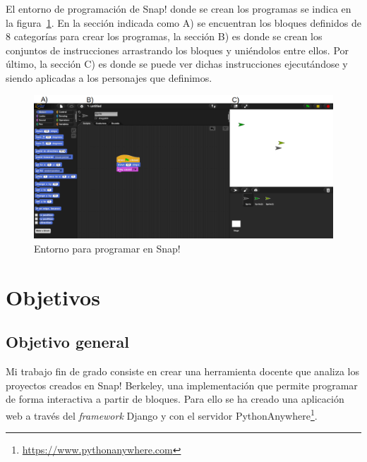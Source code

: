 \documentclass[a4paper, 12pt]{book}
\begin{document}
El entorno de programación de Snap! donde se crean los programas se indica en la figura~\ref{figura:entorno_snapp}. En la sección indicada como A) se encuentran los bloques definidos de 8 categorías para crear los programas, la sección B) es donde se crean los conjuntos de instrucciones arrastrando los bloques y uniéndolos entre ellos. Por último, la sección C) es donde se puede ver dichas instrucciones ejecutándose y siendo aplicadas a los personajes que definimos.
\begin{figure}[h]
        \centering
        \includegraphics[scale=0.35]{img/entorno.png}
        \caption{Entorno para programar en Snap!}
        \label{figura:entorno_snapp}
\end{figure}

\cleardoublepage %
\chapter{Objetivos} %
\label{chap:objetivos} %

\section{Objetivo general} %
\label{sec:objetivo-general} %

Mi trabajo fin de grado consiste en crear una herramienta docente que analiza los proyectos creados en Snap! Berkeley, una implementación que permite programar de forma interactiva a partir de bloques. Para ello se ha creado una aplicación web a través del \emph{framework} Django y con el servidor PythonAnywhere\footnote{\url{https://www.pythonanywhere.com}}.
\end{document}
